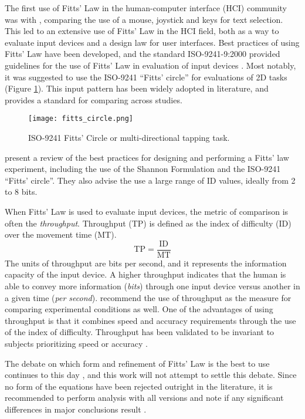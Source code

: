 The first use of Fitts' Law in the human-computer interface (HCI) community was with \citet{card_evaluation_1978}, comparing the use of a mouse, joystick and keys for text selection.
This led to an extensive use of Fitts' Law in the HCI field, both as a way to evaluate input devices and a design law for user interfaces.
Best practices of using Fitts' Law have been developed, and the standard ISO-9241-9:2000 provided guidelines for the use of Fitts' Law in evaluation of input devices \citep{international_organization_for_standardization_iso_2000}.
Most notably, it was suggested to use the ISO-9241 ``Fitts' circle'' for evaluations of 2D tasks (Figure \ref{fig:intro_fitts_circle}).
This input pattern has been widely adopted in literature, and provides a standard for comparing across studies.

\begin{figure}
    \centering
    \texttt{[image: fitts\_circle.png]}
    \caption{ISO-9241 Fitts' Circle or multi-directional tapping task.}
    \label{fig:intro_fitts_circle}
\end{figure}

\citet{soukoreff_towards_2004} present a review of the best practices for designing and performing a Fitts' law experiment, including the use of the Shannon Formulation and the ISO-9241 ``Fitts' circle''.
They also advise the use a large range of ID values, ideally from 2 to 8 bits.

When Fitts' Law is used to evaluate input devices, the metric of comparison is often the \emph{throughput}.
Throughput (TP) is defined as the index of difficulty (ID) over the movement time (MT).
\begin{equation}
    \mathrm{TP} = \frac{\text{ID}}{\text{MT}}
\end{equation}
The units of throughput are bits per second, and it represents the information capacity of the input device.
A higher throughput indicates that the human is able to convey more information (\emph{bits}) through one input device versus another in a given time (\emph{per second}).
\citet{soukoreff_towards_2004} recommend the use of throughput as the measure for comparing experimental conditions as well.
One of the advantages of using throughput is that it combines speed and accuracy requirements through the use of the index of difficulty.
Throughput has been validated to be invariant to subjects prioritizing speed or accuracy \citep{mackenzie_fitts_2008}.

The debate on which form and refinement of Fitts' Law is the best to use continues to this day \citep{drewes_only_2010,hoffmann_which_2013}, and this work will not attempt to settle this debate.
Since no form of the equations have been rejected outright in the literature, it is recommended to perform analysis with all versions and note if any significant differences in major conclusions result \citep{soukoreff_towards_2004}.

